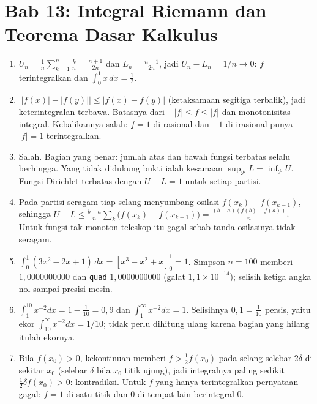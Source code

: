 \section*{Bab 13: Integral Riemann dan Teorema Dasar Kalkulus}
\begin{enumerate}[label=\textbf{13.\arabic*}]
  \item $U_{n}=\frac1n\sum_{k=1}^{n}\frac kn=\frac{n+1}{2n}$ dan
        $L_{n}=\frac{n-1}{2n}$, jadi $U_{n}-L_{n}=1/n\to0$: $f$ terintegralkan
        dan $\int_{0}^{1}x\,dx=\tfrac12$.

  \item $\bigl\lvert\lvert f(x)\rvert-\lvert f(y)\rvert\bigr\rvert
        \le\lvert f(x)-f(y)\rvert$ (ketaksamaan segitiga terbalik), jadi
        keterintegralan terbawa. Batasnya dari $-\lvert f\rvert\le f\le\lvert f\rvert$
        dan monotonisitas integral. Kebalikannya salah: $f=1$ di rasional dan
        $-1$ di irasional punya $\lvert f\rvert=1$ terintegralkan.

  \item Salah. Bagian yang benar: jumlah atas dan bawah fungsi terbatas selalu
        berhingga. Yang tidak didukung bukti ialah kesamaan
        $\sup_{\mathcal{P}}L=\inf_{\mathcal{P}}U$. Fungsi Dirichlet terbatas
        dengan $U-L=1$ untuk setiap partisi.

  \item Pada partisi seragam tiap selang menyumbang osilasi
        $f(x_{k})-f(x_{k-1})$, sehingga
        $U-L\le\frac{b-a}{n}\sum_{k}\bigl(f(x_{k})-f(x_{k-1})\bigr)
        =\frac{(b-a)(f(b)-f(a))}{n}$. Untuk fungsi tak monoton teleskop itu gagal
        sebab tanda osilasinya tidak seragam.

  \item $\int_{0}^{1}(3x^{2}-2x+1)\,dx=[x^{3}-x^{2}+x]_{0}^{1}=1$. Simpson
        $n=100$ memberi $1{,}0000000000$ dan \texttt{quad} $1{,}0000000000$
        (galat $1{,}1\times10^{-14}$); selisih ketiga angka nol sampai presisi
        mesin.

  \item $\int_{1}^{10}x^{-2}dx=1-\tfrac1{10}=0{,}9$ dan
        $\int_{1}^{\infty}x^{-2}dx=1$. Selisihnya $0{,}1=\tfrac1{10}$ persis,
        yaitu ekor $\int_{10}^{\infty}x^{-2}dx=1/10$; tidak perlu dihitung ulang
        karena bagian yang hilang itulah ekornya.

  \item Bila $f(x_{0})>0$, kekontinuan memberi $f>\tfrac12f(x_{0})$ pada selang
        selebar $2\delta$ di sekitar $x_{0}$ (selebar $\delta$ bila $x_{0}$ titik
        ujung), jadi integralnya paling sedikit
        $\tfrac12\delta f(x_{0})>0$: kontradiksi. Untuk $f$ yang hanya terintegralkan
        pernyataan gagal: $f=1$ di satu titik dan $0$ di tempat lain berintegral
        $0$.


\end{enumerate}
